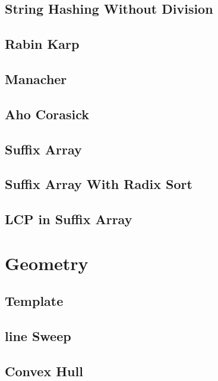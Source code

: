 \subsection{String Hashing Without Division}
\raggedbottom
\hrulefill
\subsection{Rabin Karp}
\raggedbottom
\hrulefill
\subsection{Manacher}
\raggedbottom
\hrulefill
\subsection{Aho Corasick}
\raggedbottom
\hrulefill
\subsection{Suffix Array}
\raggedbottom
\hrulefill
\subsection{Suffix Array With Radix Sort}
\raggedbottom
\hrulefill
\subsection{LCP in Suffix Array}
\raggedbottom
\hrulefill

\section{Geometry}
\subsection{Template}
\raggedbottom
\hrulefill
\subsection{line Sweep}
\raggedbottom
\hrulefill
\subsection{Convex Hull}
\raggedbottom
\hrulefill

